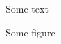 \documentclass{memoir}
\begin{document}
Some text
\begin{marginfigure}
Some figure
\caption{Some caption}
\end{marginfigure}
\end{document}

